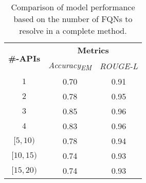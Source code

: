 \begin{table}[]
\centering
\begin{tabular}{l|cc}
\toprule
\multirow{2}{*}{\textbf{\#-APIs}} & \multicolumn{2}{c}{\textbf{Metrics}}                                  \\ \cline{2-3} 
                                   & \multicolumn{1}{c|}{\textit{Accuracy\textsubscript{EM}}} & \multicolumn{1}{c}{\textit{ROUGE-L}}  \\ \hline
\multicolumn{1}{c|}{$1$}      & \multicolumn{1}{c|}{0.70}         & \multicolumn{1}{c}{0.91}           \\
\multicolumn{1}{c|}{$2$}      & \multicolumn{1}{c|}{0.78}         & \multicolumn{1}{c}{0.95}           \\ 
\multicolumn{1}{c|}{$3$}      & \multicolumn{1}{c|}{0.85}         & \multicolumn{1}{c}{0.96}           \\ 
\multicolumn{1}{c|}{$4$}      & \multicolumn{1}{c|}{0.83}         & \multicolumn{1}{c}{0.96}          \\ 
\multicolumn{1}{c|}{$[5, 10)$}      & \multicolumn{1}{c|}{0.78}         & \multicolumn{1}{c}{0.94}           \\ 
\multicolumn{1}{c|}{$[10, 15)$}      & \multicolumn{1}{c|}{0.74}         & \multicolumn{1}{c}{0.93}           \\ 
\multicolumn{1}{c|}{$[15, 20)$}      & \multicolumn{1}{c|}{0.74}         & \multicolumn{1}{c}{0.93}          \\ \bottomrule
\end{tabular}
\caption{Comparison of model performance based on the number of FQNs to resolve in a complete method.}
\label{tab:strat-eval}
\end{table}